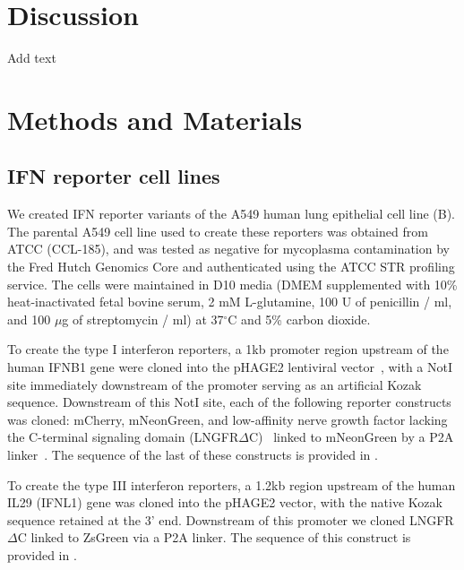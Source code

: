 \documentclass[9pt,lineno]{elife}
\begin{document}
\begin{figure}
\begin{fullwidth}
\label{figdata:mutations}

\end{fullwidth}
\end{figure}

\section{Discussion}

Add text

\section{Methods and Materials}

\subsection{IFN reporter cell lines}
We created IFN reporter variants of the A549 human lung epithelial cell line (B).
The parental A549 cell line used to create these reporters was obtained from ATCC (CCL-185), and was tested as negative for mycoplasma contamination by the Fred Hutch Genomics Core and authenticated using the ATCC STR profiling service.
The cells were maintained in D10 media (DMEM supplemented with 10\% heat-inactivated fetal bovine serum, 2 mM L-glutamine, 100 U of penicillin / ml, and 100 $\mu$g of streptomycin / ml) at 37$^{\circ}$C and 5\% carbon dioxide.

To create the type I interferon reporters, a 1kb promoter region upstream of the human IFNB1 gene were cloned into the pHAGE2 lentiviral vector~\citep{oconnell2010lentiviral}, with a NotI site immediately downstream of the promoter serving as an artificial Kozak sequence. 
Downstream of this NotI site, each of the following reporter constructs was cloned: mCherry, mNeonGreen, and low-affinity nerve growth factor lacking the C-terminal signaling domain (LNGFR$\Delta$C)~\citep{bonini1997hsv,ruggieri1997cell} linked to mNeonGreen by a P2A linker~\citep{kim2011high}.
The sequence of the last of these constructs is provided in .

To create the type III interferon reporters, a 1.2kb region upstream of the human IL29 (IFNL1) gene was cloned into the pHAGE2 vector, with the native Kozak sequence retained at the 3' end. 
Downstream of this promoter we cloned LNGFR$\Delta$C linked to ZsGreen via a P2A linker.
The sequence of this construct is provided in .
 
\end{document}
